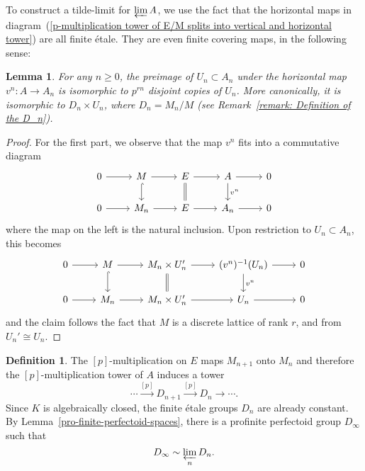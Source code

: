 \documentclass[10pt,oneside]{amsart}
\newtheorem{lemma}[theorem]{Lemma}
\theoremstyle{definition}
\newtheorem{definition}[theorem]{Definition}
\begin{document}
	To construct a tilde-limit for $\varprojlim A$, we use the fact that the horizontal maps in diagram~(\ref{p-multiplication tower of E/M splits into vertical and horizontal tower}) are all finite \'etale. They are even finite covering maps, in the following sense:
	\begin{lemma}\label{horizontal map is covering map}
		For any $n\geq 0$, the preimage of $U_n\subset A_n$ under the horizontal map $v^{n}\colon A\rightarrow A_n$ is isomorphic to $p^{rn}$ disjoint copies of $U_n$. More canonically, it is isomorphic to $D_{n}\times U_n$, where $D_n=M_n/M$ (see Remark~\ref{remark: Definition of the D_n}).
	\end{lemma}
	\begin{proof}
		For the first part, we observe that the map $v^n$ fits into a commutative diagram
			\begin{equation}\label{v-tower for E/M}
			\begin{tikzcd}
			0 \arrow[r] & M \arrow[d, hook] \arrow[r] & E \arrow[d,equal] \arrow[r] &  A\arrow[d, "{v^{n}}"] \arrow[r] & 0 \\
			0 \arrow[r] & M_n \arrow[r] & E \arrow[r] & A_n \arrow[r] & 0
			\end{tikzcd}
			\end{equation}
	where the map on the left is the natural inclusion. Upon restriction to $U_n\subset A_n$, this becomes
					\begin{equation}\label{v-tower for E/M-local}
		\begin{tikzcd}
		0 \arrow[r] & M \arrow[d, hook] \arrow[r] & M_n\times U'_n \arrow[d,equal] \arrow[r] &  (v^{n})^{-1}(U_n)\arrow[d, "{v^{n}}"] \arrow[r] & 0 \\
		0 \arrow[r] & M_n \arrow[r] & M_n\times U'_n \arrow[r] & U_n \arrow[r] & 0
		\end{tikzcd}
		\end{equation}
	and the claim follows the fact that $M$ is a discrete lattice of rank $r$, and from $U_n'\cong U_n$.
	\end{proof}
	\begin{definition}
The $[p]$-multiplication on $E$ maps $M_{n+1}$ onto $M_n$ and therefore the $[p]$-multiplication tower of $A$ induces a tower
 \[\cdots \xrightarrow{[p]}D_{n+1}\xrightarrow{[p]}D_n\rightarrow\cdots.\]
  Since $K$ is algebraically closed, the finite \'etale groups $D_n$ are already constant.  By Lemma~\ref{pro-finite-perfectoid-spaces}, there is a profinite perfectoid group $D_\infty$ such that
  \[D_\infty\sim \varprojlim_n D_n.\]
 \end{definition}
	
\end{document}

